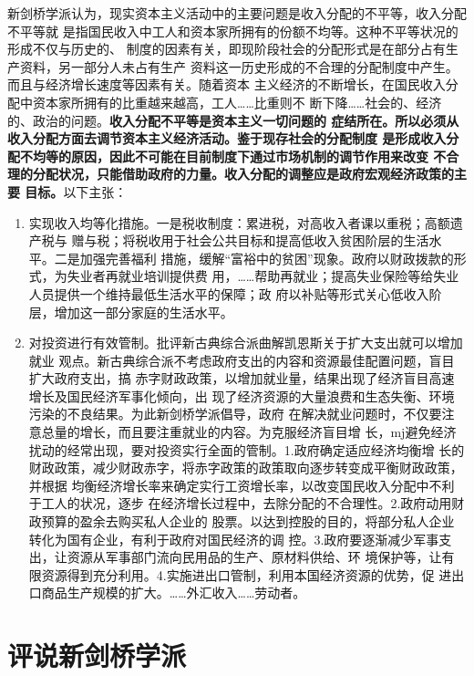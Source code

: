 新剑桥学派认为，现实资本主义活动中的主要问题是收入分配的不平等，收入分配不平等就
是指国民收入中工人和资本家所拥有的份额不均等。这种不平等状况的形成不仅与历史的、
制度的因素有关，即现阶段社会的分配形式是在部分占有生产资料，另一部分人未占有生产
资料这一历史形成的不合理的分配制度中产生。而且与经济增长速度等因素有关。随着资本
主义经济的不断增长，在国民收入分配中资本家所拥有的比重越来越高，工人……比重则不
断下降……社会的、经济的、政治的问题。\textbf{收入分配不平等是资本主义一切问题的
  症结所在。所以必须从收入分配方面去调节资本主义经济活动。鉴于现存社会的分配制度
  是形成收入分配不均等的原因，因此不可能在目前制度下通过市场机制的调节作用来改变
  不合理的分配状况，只能借助政府的力量。收入分配的调整应是政府宏观经济政策的主要
  目标。}以下主张：
\begin{enumerate}
\item 实现收入均等化措施。一是税收制度：累进税，对高收入者课以重税；高额遗产税与
  赠与税；将税收用于社会公共目标和提高低收入贫困阶层的生活水平。二是加强完善福利
  措施，缓解“富裕中的贫困”现象。政府以财政拨款的形式，为失业者再就业培训提供费
  用，……帮助再就业；提高失业保险等给失业人员提供一个维持最低生活水平的保障；政
  府以补贴等形式关心低收入阶层，增加这一部分家庭的生活水平。


\item  对投资进行有效管制。批评新古典综合派曲解凯恩斯关于扩大支出就可以增加就业
  观点。新古典综合派不考虑政府支出的内容和资源最佳配置问题，盲目扩大政府支出，搞
  赤字财政政策，以增加就业量，结果出现了经济盲目高速增长及国民经济军事化倾向，出
  现了经济资源的大量浪费和生态失衡、环境污染的不良结果。为此新剑桥学派倡导，政府
  在解决就业问题时，不仅要注意总量的增长，而且要注重就业的内容。为克服经济盲目增
  长，mj避免经济扰动的经常出现，要对投资实行全面的管制。1.政府确定适应经济均衡增
  长的财政政策，减少财政赤字，将赤字政策的政策取向逐步转变成平衡财政政策，并根据
  均衡经济增长率来确定实行工资增长率，以改变国民收入分配中不利于工人的状况，逐步
  在经济增长过程中，去除分配的不合理性。2.政府动用财政预算的盈余去购买私人企业的
  股票。以达到控股的目的，将部分私人企业转化为国有企业，有利于政府对国民经济的调
  控。3.政府要逐渐减少军事支出，让资源从军事部门流向民用品的生产、原材料供给、环
  境保护等，让有限资源得到充分利用。4.实施进出口管制，利用本国经济资源的优势，促
  进出口商品生产规模的扩大。……外汇收入……劳动者。

\end{enumerate}

\section{评说新剑桥学派}

